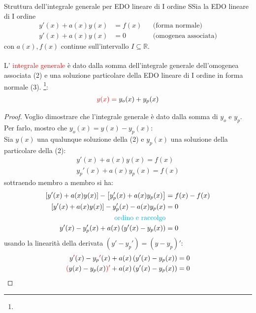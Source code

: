 \documentclass{article}  %
\begin{document}
\begin{theorem}{Struttura dell'integrale generale per EDO lineare di I ordine}
	SSia la EDO lineare di I ordine
	\begin{align}
		y'(x)+a(x)y(x) & = f(x) &  & \text{(forma normale)}      \\
		y'(x)+a(x)y(x) & = 0    &  & \text{(omogenea associata)}
	\end{align}
	con $a(x),f(x)$ continue sull'intervallo $I \subseteq \mathbb{R}$. \\ \\
	L' \textcolor{red}{integrale generale} è dato dalla somma dell'integrale generale dell'omogenea associata (2) e una soluzione particolare della EDO lineare di I ordine in forma normale (3). \footnote{
	}:
	\begin{align*}
		\textcolor{red}{y(x) =} \; y_o(x)+y_p(x)
	\end{align*}
	\begin{proof}
		Voglio dimostrare che l'integrale generale è dato dalla somma di $y_o$ e $y_p$. Per farlo, mostro che $y_o(x)=y(x)-y_p(x)$: \\
		Sia $y(x)$ una qualunque soluzione della (2) e $y_p(x)$ una soluzione della particolare della (2):
		\begin{align*}
			y'(x)+a(x)y(x) = f(x) \\
			y_p'(x)+a(x)y_p(x) = f(x)
		\end{align*}
		sottraendo membro a membro si ha:
		\begin{align*}
			\left[y'(x)+a(x)y(x)\right] - \left[y_p'(x)+a(x)y_p(x)\right] & = f(x)-f(x) \\
			\left[y'(x)+a(x)y(x)\right] - y_p'(x)-a(x)y_p(x)              & = 0         \\
			\text{\textcolor{cyan}{ordino e raccolgo}}                                  \\
			y'(x)- y_p'(x)+a(x)\left(y'(x)-y_p(x)\right)                  & = 0
		\end{align*}
		usando la linearità della derivata $(y'-y_p')=(y-y_p)'$:
		\begin{align*}
			y\textcolor{red}{'}(x)- y_p\textcolor{red}{'}(x)+a(x)\left(y'(x)-y_p(x)\right)  & = 0 \\
			\textcolor{red}{(}y(x)- y_p(x)\textcolor{red}{)'}+a(x)\left(y'(x)-y_p(x)\right) & = 0

\end{align*}
\end{proof}
\end{theorem}
\end{document}
